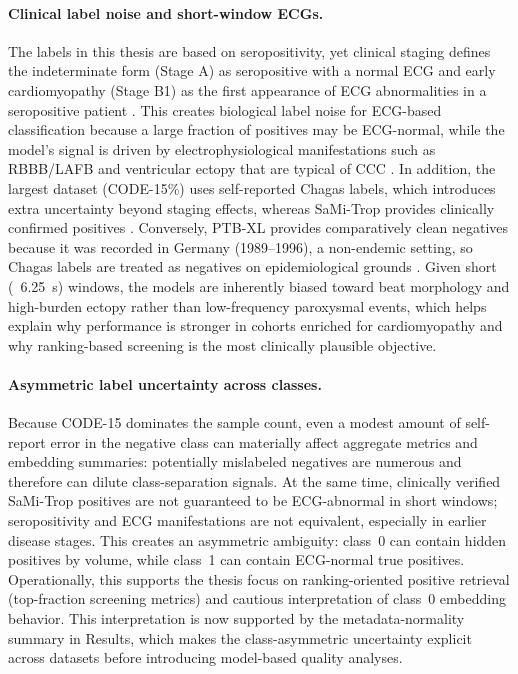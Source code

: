 \paragraph{Clinical label noise and short-window ECGs.}
The labels in this thesis are based on seropositivity, yet clinical staging defines the indeterminate form (Stage A) as seropositive with a normal ECG and early cardiomyopathy (Stage B1) as the first appearance of ECG abnormalities in a seropositive patient \parencite{chagas_progression_2022,lancet_clinical_chagas_features_2024}.
This creates biological label noise for ECG-based classification because a large fraction of positives may be ECG-normal, while the model's signal is driven by electrophysiological manifestations such as RBBB/LAFB and ventricular ectopy that are typical of CCC \parencite{chagas_ecg_abnormalities_2018,lancet_clinical_chagas_features_2024}.
In addition, the largest dataset (CODE-15\%) uses self-reported Chagas labels, which introduces extra uncertainty beyond staging effects, whereas SaMi-Trop provides clinically confirmed positives \parencite{ribeiro_code-15_2021,ribeiro_sami-trop_2021}.
Conversely, PTB-XL provides comparatively clean negatives because it was recorded in Germany (1989--1996), a non-endemic setting, so Chagas labels are treated as negatives on epidemiological grounds \parencite{wagner_ptb_xl}.
Given short (~6.25~s) windows, the models are inherently biased toward beat morphology and high-burden ectopy rather than low-frequency paroxysmal events, which helps explain why performance is stronger in cohorts enriched for cardiomyopathy and why ranking-based screening is the most clinically plausible objective.

\paragraph{Asymmetric label uncertainty across classes.}
Because CODE-15 dominates the sample count, even a modest amount of self-report error in the negative class can materially affect aggregate metrics and embedding summaries: potentially mislabeled negatives are numerous and therefore can dilute class-separation signals.
At the same time, clinically verified SaMi-Trop positives are not guaranteed to be ECG-abnormal in short windows; seropositivity and ECG manifestations are not equivalent, especially in earlier disease stages.
This creates an asymmetric ambiguity: class~0 can contain hidden positives by volume, while class~1 can contain ECG-normal true positives.
Operationally, this supports the thesis focus on ranking-oriented positive retrieval (top-fraction screening metrics) and cautious interpretation of class~0 embedding behavior.
This interpretation is now supported by the metadata-normality summary in Results, which makes the class-asymmetric uncertainty explicit across datasets before introducing model-based quality analyses.


